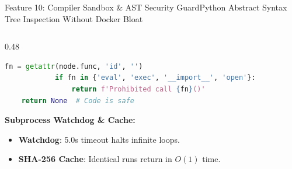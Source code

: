 \documentclass[aspectratio=169,10pt]{beamer}
\begin{document}
\begin{frame}[fragile,t]{Feature 10: Compiler Sandbox \& AST Security Guard}{Python Abstract Syntax Tree Inspection Without Docker Bloat}
\begin{columns}[t]
\begin{column}{0.48\textwidth}
\begin{lstlisting}[language=Python]
            fn = getattr(node.func, 'id', '')
            if fn in {'eval', 'exec', '__import__', 'open'}:
                return f'Prohibited call {fn}()'
    return None  # Code is safe
\end{lstlisting}
      \vspace{0.08cm}
      {\fontsize{8.0}{10.0}\selectfont\textbf{\textcolor{KoinexaOrange}{Subprocess Watchdog \& Cache:}}}
      \begin{itemize}\setlength{\itemsep}{0.8pt}
        \item {\fontsize{7.5}{9.2}\selectfont \textbf{Watchdog}: 5.0s timeout halts infinite loops.}
        \item {\fontsize{7.5}{9.2}\selectfont \textbf{SHA-256 Cache}: Identical runs return in $O(1)$ time.}
      \end{itemize}
    \end{column}
  \end{columns}
\end{frame}
\end{document}
